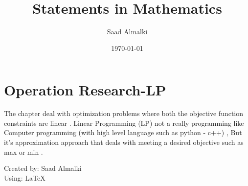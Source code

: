 \documentclass[12pt]{article}
\title{Statements in Mathematics}
\author{Saad Almalki}
\date{\today}
\begin{document}
\maketitle

\section{Operation Research-LP}

The chapter deal with optimization problems where both the objective function constraints are linear . Linear Programming (LP) not a really programming like Computer programming (with high level
language such as python - c++) , But it's approximation approach that deals with meeting a desired objective such as max or min .

\begin{flushright}
Created by: Saad Almalki \\
Using: \LaTeX
\end{flushright}
\end{document}
